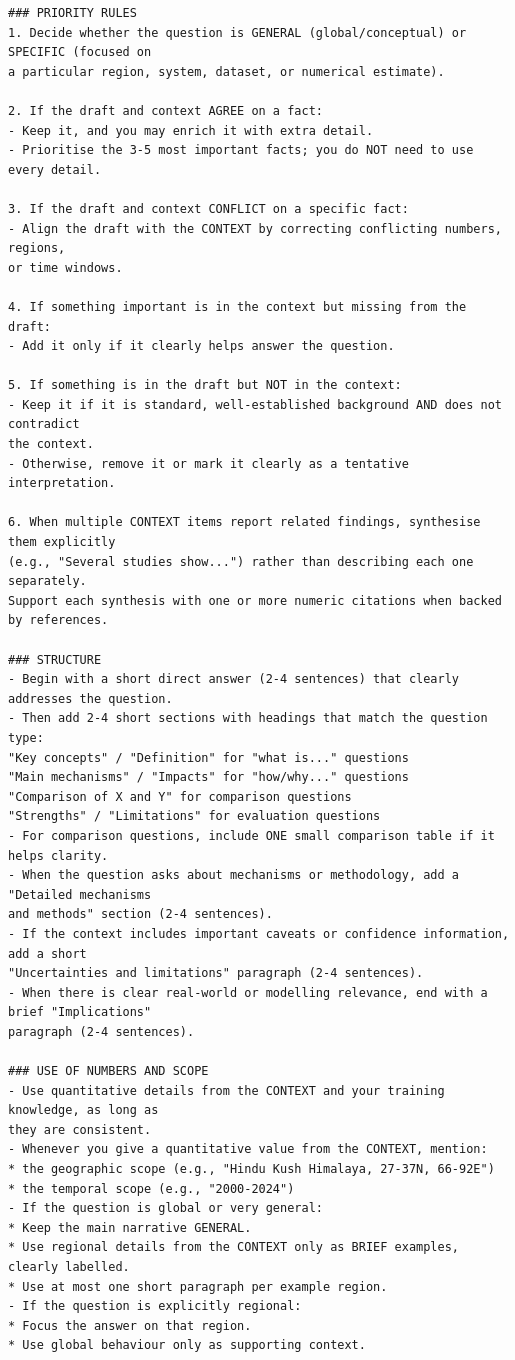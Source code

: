 \begin{lstlisting}[style=promptstyle,
caption={Generation Agent refinement prompt (full).},
label={lst:generation-prompt}]
### PRIORITY RULES
1. Decide whether the question is GENERAL (global/conceptual) or SPECIFIC (focused on
a particular region, system, dataset, or numerical estimate).

2. If the draft and context AGREE on a fact:
- Keep it, and you may enrich it with extra detail.
- Prioritise the 3-5 most important facts; you do NOT need to use every detail.

3. If the draft and context CONFLICT on a specific fact:
- Align the draft with the CONTEXT by correcting conflicting numbers, regions,
or time windows.

4. If something important is in the context but missing from the draft:
- Add it only if it clearly helps answer the question.

5. If something is in the draft but NOT in the context:
- Keep it if it is standard, well-established background AND does not contradict
the context.
- Otherwise, remove it or mark it clearly as a tentative interpretation.

6. When multiple CONTEXT items report related findings, synthesise them explicitly
(e.g., "Several studies show...") rather than describing each one separately.
Support each synthesis with one or more numeric citations when backed by references.

### STRUCTURE
- Begin with a short direct answer (2-4 sentences) that clearly addresses the question.
- Then add 2-4 short sections with headings that match the question type:
"Key concepts" / "Definition" for "what is..." questions
"Main mechanisms" / "Impacts" for "how/why..." questions
"Comparison of X and Y" for comparison questions
"Strengths" / "Limitations" for evaluation questions
- For comparison questions, include ONE small comparison table if it helps clarity.
- When the question asks about mechanisms or methodology, add a "Detailed mechanisms
and methods" section (2-4 sentences).
- If the context includes important caveats or confidence information, add a short
"Uncertainties and limitations" paragraph (2-4 sentences).
- When there is clear real-world or modelling relevance, end with a brief "Implications"
paragraph (2-4 sentences).

### USE OF NUMBERS AND SCOPE
- Use quantitative details from the CONTEXT and your training knowledge, as long as
they are consistent.
- Whenever you give a quantitative value from the CONTEXT, mention:
* the geographic scope (e.g., "Hindu Kush Himalaya, 27-37N, 66-92E")
* the temporal scope (e.g., "2000-2024")
- If the question is global or very general:
* Keep the main narrative GENERAL.
* Use regional details from the CONTEXT only as BRIEF examples, clearly labelled.
* Use at most one short paragraph per example region.
- If the question is explicitly regional:
* Focus the answer on that region.
* Use global behaviour only as supporting context.


\end{lstlisting}
